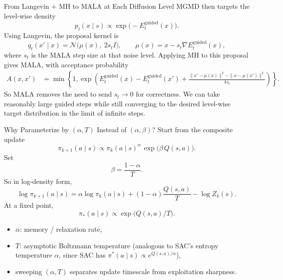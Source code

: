 \documentclass[aspectratio=169,11pt]{beamer}
\begin{document}
 \begin{frame}{From Langevin $+$ MH to MALA at Each Diffusion Level}
 \small
 MGMD then targets the level-wise density
 \[
 p_t(x\mid s)\propto \exp\!\bigl(-E_t^{\mathrm{guided}}(x)\bigr).
 \]
 Using Langevin, the proposal kernel is
 \[
 q_t(x'\mid x)=\mathcal{N}\!\bigl(\mu(x),\; 2s_t I\bigr),\qquad \mu(x)=x-s_t\nabla E_t^{\mathrm{guided}}(x),
 \]
 where $s_t$ is the MALA step size at that noise level. Applying MH to this proposal gives MALA, with acceptance probability
 \[
 \begin{aligned}
A(x,x')&=\min\!\left\{1,\exp\!\left(E_t^{\mathrm{guided}}(x)-E_t^{\mathrm{guided}}(x')\right.
 + \left.\frac{\|x'-\mu(x)\|^2-\|x-\mu(x')\|^2}{4s_t}\right)\right\}.
\end{aligned}
\]
So MALA removes the need to send $s_t\to 0$ for correctness. We can take reasonably large guided steps while still converging to the desired level-wise target distribution in the limit of infinite steps.
\end{frame}

\begin{frame}{Why Parameterize by $(\alpha,T)$ Instead of $(\alpha,\beta)$?}
\small
Start from the composite update
\[
\pi_{k+1}(a\mid s)\propto \pi_k(a\mid s)^\alpha\,\exp\!\bigl(\beta\,Q(s,a)\bigr).
\]
Set
\[
\beta=\frac{1-\alpha}{T}.
\]
So in log-density form,
\[
\log \pi_{k+1}(a\mid s)
= \alpha\log \pi_k(a\mid s) + (1-\alpha)\frac{Q(s,a)}{T} - \log Z_k(s).
\]
At a fixed point,
\[
\pi_*(a\mid s)\propto \exp\!\bigl(Q(s,a)/T\bigr).
\]
\begin{itemize}
  \item $\alpha$: memory / relaxation rate,
  \item $T$: asymptotic Boltzmann temperature (analogous to SAC's entropy temperature $\alpha$, since SAC has $\pi^*(a\mid s)\propto e^{Q(s,a)/\alpha}$),
  \item sweeping $(\alpha,T)$ separates update timescale from exploitation sharpness.
\end{itemize}
\end{frame}
\end{document}
